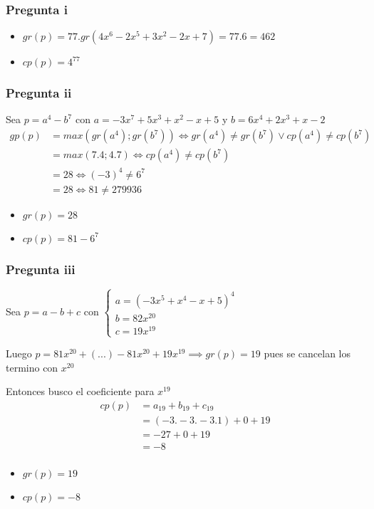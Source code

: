 \subsubsection{Pregunta i}

\begin{itemize}
    \item $ gr(p) = 77 . gr(4x^6-2x^5+3x^2-2x+7) = 77.6 = 462 $
    \item $ cp(p) = 4^{77} $ 
\end{itemize}

\subsubsection{Pregunta ii}

Sea $ p = a^4 - b^7 $ con $ a = -3x^7 + 5x^3 + x^2 - x + 5 $ y $ b = 6x^4 + 2x^3 + x - 2 $
\begin{align*}
    gp(p) &= max(gr(a^4); gr(b^7)) \iff gr(a^4) \neq gr(b^7) \vee cp(a^4) \neq cp(b^7) \\
    &= max(7.4; 4.7) \iff cp(a^4) \neq cp(b^7) \\
    &= 28 \iff (-3)^4 \neq 6^7 \\
    &= 28 \iff 81 \neq 279936
\end{align*}
\begin{itemize}
    \item $ gr(p) = 28 $
    \item $ cp(p) = 81-6^7 $ 
\end{itemize}

\subsubsection{Pregunta iii}

Sea $ p = a - b + c $ con $ \begin{cases}
    a = (-3x^5 + x^4 - x + 5)^4 \\
    b = 82x^{20} \\
    c = 19x^{19}
\end{cases} $

Luego $ p = 81x^{20} + (...) - 81x^{20}+19x^{19} \implies gr(p) = 19 $ pues se cancelan los termino con $ x^{20} $

Entonces busco el coeficiente para $ x^{19} $
\begin{align*}
    cp(p) &= a_{19} + b_{19} + c_{19} \\
    &= (-3.-3.-3.1) + 0 + 19 \\
    &= -27 + 0 + 19 \\
    &= -8 \\
\end{align*}
\begin{itemize}
    \item $ gr(p) = 19 $
    \item $ cp(p) = -8 $ 
\end{itemize}

